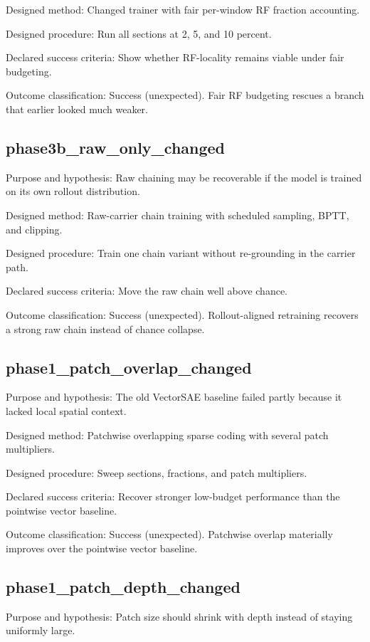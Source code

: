 \documentclass[11pt]{article}
\begin{document}
Designed method: Changed trainer with fair per-window RF fraction accounting.


Designed procedure: Run all sections at 2, 5, and 10 percent.


Declared success criteria: Show whether RF-locality remains viable under fair budgeting.


Outcome classification: Success (unexpected). Fair RF budgeting rescues a branch that earlier looked much weaker.


\subsection{phase3b\_raw\_only\_changed}
Purpose and hypothesis: Raw chaining may be recoverable if the model is trained on its own rollout distribution.


Designed method: Raw-carrier chain training with scheduled sampling, BPTT, and clipping.


Designed procedure: Train one chain variant without re-grounding in the carrier path.


Declared success criteria: Move the raw chain well above chance.


Outcome classification: Success (unexpected). Rollout-aligned retraining recovers a strong raw chain instead of chance collapse.


\subsection{phase1\_patch\_overlap\_changed}
Purpose and hypothesis: The old VectorSAE baseline failed partly because it lacked local spatial context.


Designed method: Patchwise overlapping sparse coding with several patch multipliers.


Designed procedure: Sweep sections, fractions, and patch multipliers.


Declared success criteria: Recover stronger low-budget performance than the pointwise vector baseline.


Outcome classification: Success (unexpected). Patchwise overlap materially improves over the pointwise vector baseline.


\subsection{phase1\_patch\_depth\_changed}
Purpose and hypothesis: Patch size should shrink with depth instead of staying uniformly large.
\end{document}
